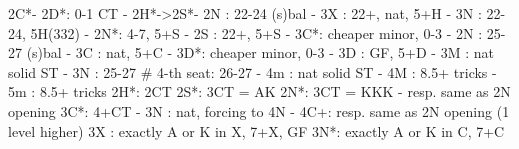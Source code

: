 2C*- 
2D*: 0-1 CT
   - 2H*->2S*- 2N : 22-24 (s)bal
             - 3X : 22+, nat, 5+H
             - 3N : 22-24, 5H(332)
        - 2N*: 4-7, 5+S
   - 2S : 22+, 5+S
        - 3C*: cheaper minor, 0-3
   - 2N : 25-27 (s)bal
   - 3C : nat, 5+C
        - 3D*: cheaper minor, 0-3
   - 3D : GF, 5+D
   - 3M : nat solid ST
   - 3N : 25-27  # 4-th seat: 26-27
   - 4m : nat solid ST
   - 4M : 8.5+ tricks
   - 5m : 8.5+ tricks
2H*: 2CT
2S*: 3CT = AK
2N*: 3CT = KKK
   - resp. same as 2N opening
3C*: 4+CT
   - 3N : nat, forcing to 4N
        - 4C+: resp. same as 2N opening (1 level higher)
3X : exactly A or K in X, 7+X, GF
3N*: exactly A or K in C, 7+C
